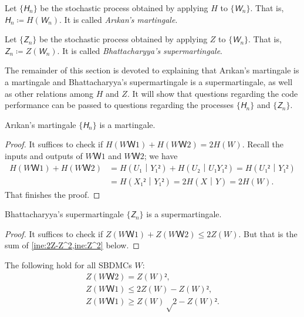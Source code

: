 \documentclass[openany]{amsbook}
\numberwithin{equation}{chapter}
\numberwithin{figure}{chapter}
\numberwithin{table}{chapter}
\theoremstyle{definition}	理dfn:Definition~?s			理exa:Example~?s
\theoremstyle{remark}		理cla:Claim~?s				理rem:Remark~?s
\begin{document}
	\begin{dfn}
		Let $\{𝘏_n\}$ be the stochastic process obtained by applying $H$ to $\{𝘞_n\}$.
		That is, $𝘏_n≔H(𝘞_n)$.
		It is called \emph{Arıkan's martingale}.
	\end{dfn}
	
	\begin{dfn}
		Let $\{𝘡_n\}$ be the stochastic process obtained by applying $Z$ to $\{𝘞_n\}$.
		That is, $𝘡_n≔Z(𝘞_n)$.
		It is called \emph{Bhattacharyya's supermartingale}.
	\end{dfn}
	
	The remainder of this section is devoted to explaining that Arıkan's martingale
	is a martingale and Bhattacharyya's supermartingale is a supermartingale,
	as well as other relations among $H$ and $Z$.
	It will show that questions regarding the code performance
	can be passed to questions regarding the processes $\{𝘏_n\}$ and $\{𝘡_n\}$.
	
	\begin{pro}\label{pro:martin}
		Arıkan's martingale $\{𝘏_n\}$ is a martingale.
	\end{pro}
	
	\begin{proof}
		It suffices to check if $H(WＷ1)+H(WＷ2)=2H(W)$.
		Recall the inputs and outputs of $WＷ1$ and $WＷ2$;
		we have
		\begin{align*}
			H(WＷ1)+H(WＷ2)
			&	=H(U₁｜Y₁²)+H(U₂｜U₁Y₁²)=H(U₁²｜Y₁²)	\\
			&	=H(X₁²｜Y₁²)=2H(X｜Y)=2H(W).
		\end{align*}
		That finishes the proof.
	\end{proof}
	
	\begin{pro}\label{pro:superm}
		Bhattacharyya's supermartingale $\{𝘡_n\}$ is a supermartingale.
	\end{pro}
	
	\begin{proof}
		It suffices to check if $Z(WＷ1)+Z(WＷ2)≤2Z(W)$.
		But that is the sum of \cref{ine:2Z-Z^2,ine:Z^2} below.
	\end{proof}
	
	\begin{lem}[Evolution of $Z$]\label{lem:squares}
		The following hold for all SBDMCs $W$:
		\begin{gather*}
			Z(WＷ2)=Z(W)²,				\label{ine:Z^2}\\
			Z(WＷ1)≤2Z(W)-Z(W)²,		\label{ine:2Z-Z^2}\\
			Z(WＷ1)≥Z(W)√{2-Z(W)²}.	\label{ine:2-Z^2}
		\end{gather*}
	\end{lem}
	
\end{document}
